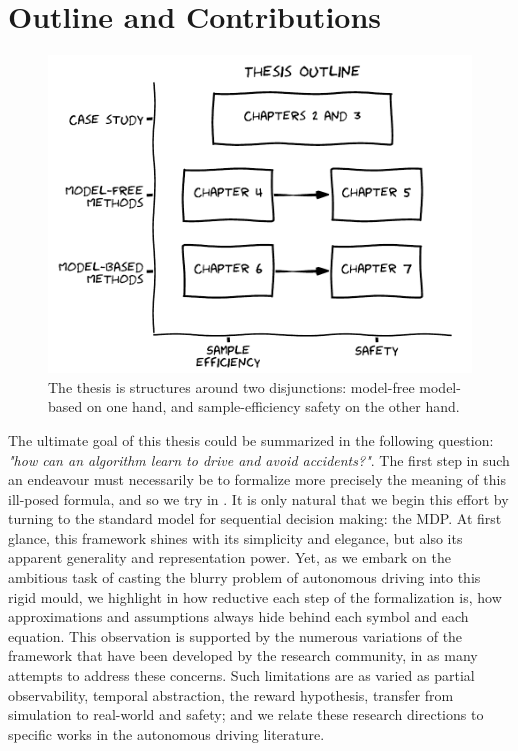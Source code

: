 \section{Outline and Contributions}

\begin{figure}[ht]
	\includegraphics[width=0.9\linewidth]{img/outline}
	\caption{The thesis is structures around two disjunctions: model-free \vs model-based on one hand, and sample-efficiency \vs safety on the other hand.}
	\label{fig:thesis-outline}
\end{figure}

The ultimate goal of this thesis could be summarized in the following question: \emph{"how can an algorithm learn to drive and avoid accidents?"}. The first step in such an endeavour must necessarily be to formalize more precisely the meaning of this ill-posed formula, and so we try in .
It is only natural that we begin this effort by turning to the standard model for sequential decision making: the \acl*{MDP}. At first glance, this framework shines with its simplicity and elegance, but also its apparent generality and representation power. Yet, as we embark on the ambitious task of casting the blurry problem of autonomous driving into this rigid mould, we highlight in  how reductive each step of the formalization is, how approximations and assumptions always hide behind each symbol and each equation. This observation is supported by the numerous variations of the framework that have been developed by the research community, in as many attempts to address these concerns. Such limitations are as varied as partial observability, temporal abstraction, the reward hypothesis, transfer from simulation to real-world and safety; and we relate these research directions to specific works in the autonomous driving literature.

